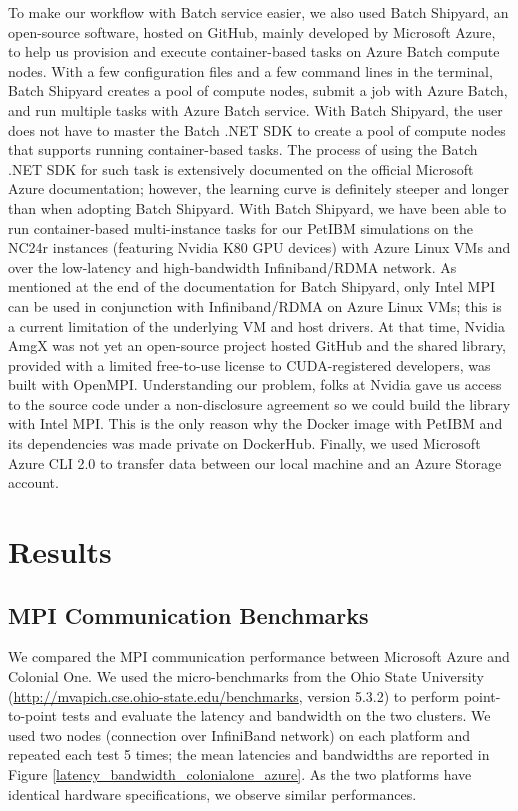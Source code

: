 \documentclass[12pt]{article}
\begin{document}
To make our workflow with Batch service easier, we also used Batch Shipyard, an open-source software, hosted on GitHub, mainly developed by Microsoft Azure, to help us provision and execute container-based tasks on Azure Batch compute nodes.
With a few configuration files and a few command lines in the terminal, Batch Shipyard creates a pool of compute nodes, submit a job with Azure Batch, and run multiple tasks with Azure Batch service.
With Batch Shipyard, the user does not have to master the Batch .NET SDK to create a pool of compute nodes that supports running container-based tasks.
The process of using the Batch .NET SDK for such task is extensively documented on the official Microsoft Azure documentation; however, the learning curve is definitely steeper and longer than when adopting Batch Shipyard.
With Batch Shipyard, we have been able to run container-based multi-instance tasks for our PetIBM simulations on the NC24r instances (featuring Nvidia K80 GPU devices) with Azure Linux VMs and over the low-latency and high-bandwidth Infiniband/RDMA network.
As mentioned at the end of the documentation for Batch Shipyard, only Intel MPI can be used in conjunction with Infiniband/RDMA on Azure Linux VMs; this is a current limitation of the underlying VM and host drivers.
At that time, Nvidia AmgX was not yet an open-source project hosted GitHub and the shared library, provided with a limited free-to-use license to CUDA-registered developers, was built with OpenMPI.
Understanding our problem, folks at Nvidia gave us access to the source code under a non-disclosure agreement so we could build the library with Intel MPI.
This is the only reason why the Docker image with PetIBM and its dependencies was made private on DockerHub.
Finally, we used Microsoft Azure CLI 2.0 to transfer data between our local machine and an Azure Storage account.


\section{Results}

\subsection{MPI Communication Benchmarks}

We compared the MPI communication performance between Microsoft Azure and Colonial One.
We used the micro-benchmarks from the Ohio State University (\url{http://mvapich.cse.ohio-state.edu/benchmarks}, version 5.3.2) to perform point-to-point tests and evaluate the latency and bandwidth on the two clusters. We used two nodes (connection over InfiniBand network) on each platform and repeated each test 5 times; the mean latencies and bandwidths are reported in Figure \ref{latency_bandwidth_colonialone_azure}. As the two platforms have identical hardware specifications, we observe similar performances.
\end{document}
